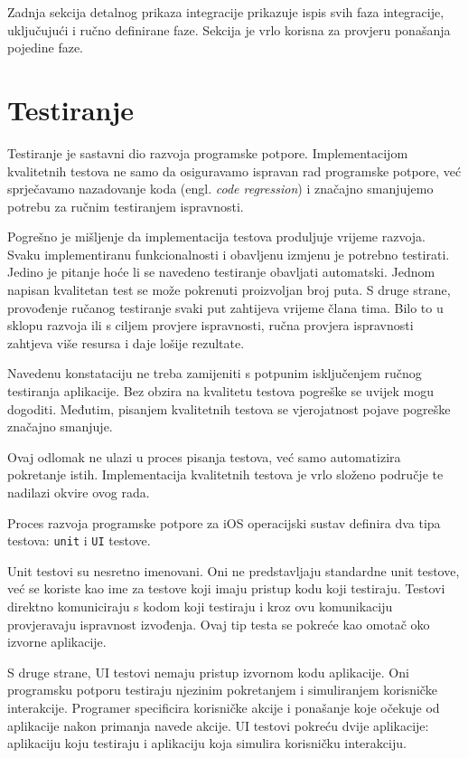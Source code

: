 \documentclass[times, utf8, diplomski, numeric]{fer}
\newcommand{\eng}[1]{(engl. \textit{#1})}
\begin{document}
Zadnja sekcija detalnog prikaza integracije prikazuje ispis svih faza integracije, uključujući i ručno definirane faze. Sekcija je vrlo korisna za provjeru ponašanja pojedine faze.

\section{Testiranje}

Testiranje je sastavni dio razvoja programske potpore. Implementacijom kvalitetnih testova ne samo da osiguravamo ispravan rad programske potpore, već sprječavamo nazadovanje koda \eng{code regression} i značajno smanjujemo potrebu za ručnim testiranjem ispravnosti\citep{wiki:SoftwareTesting}.

Pogrešno je mišljenje da implementacija testova produljuje vrijeme razvoja. Svaku implementiranu funkcionalnosti i obavljenu izmjenu je potrebno testirati. Jedino je pitanje hoće li se navedeno testiranje obavljati automatski. Jednom napisan kvalitetan test se može pokrenuti proizvoljan broj puta. S druge strane, provođenje ručanog testiranje svaki put zahtijeva vrijeme člana tima. Bilo to u sklopu razvoja ili s ciljem provjere ispravnosti, ručna provjera ispravnosti zahtjeva više resursa i daje lošije rezultate.

Navedenu konstataciju ne treba zamijeniti s potpunim isključenjem ručnog testiranja aplikacije. Bez obzira na kvalitetu testova pogreške se uvijek mogu dogoditi. Međutim, pisanjem kvalitetnih testova se vjerojatnost pojave pogreške značajno smanjuje.

Ovaj odlomak ne ulazi u proces pisanja testova, već samo automatizira pokretanje istih. Implementacija kvalitetnih testova je vrlo složeno područje te nadilazi okvire ovog rada.

Proces razvoja programske potpore za iOS operacijski sustav definira dva tipa testova: \verb|unit| i \verb|UI| testove.

Unit testovi su nesretno imenovani. Oni ne predstavljaju standardne unit testove, već se koriste kao ime za testove koji imaju pristup kodu koji testiraju. Testovi direktno komuniciraju s kodom koji testiraju i kroz ovu komunikaciju provjeravaju ispravnost izvođenja. Ovaj tip testa se pokreće kao omotač oko izvorne aplikacije.

S druge strane, UI testovi nemaju pristup izvornom kodu aplikacije. Oni programsku potporu testiraju njezinim pokretanjem i simuliranjem korisničke interakcije. Programer specificira korisničke akcije i ponašanje koje očekuje od aplikacije nakon primanja navede akcije. UI testovi pokreću dvije aplikacije: aplikaciju koju testiraju i aplikaciju koja simulira korisničku interakciju.
\end{document}
